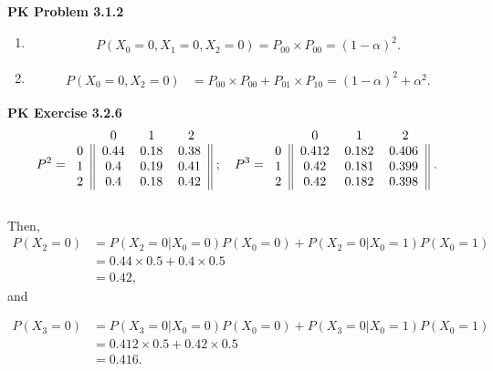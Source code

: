 \documentclass{article}
\begin{document}
\textbf{PK Problem 3.1.2}
\begin{enumerate}[label=(\alph*)]
    \item \begin{align}
        P(X_0=0, X_1=0, X_2=0) = P_{00}\times P_{00} = (1-\alpha)^2. \nonumber
    \end{align}

    \item \begin{align}
        P(X_0=0, X_2=0) & = P_{00}\times P_{00} + P_{01}\times P_{10} = (1-\alpha)^2 + \alpha^2. \nonumber
    \end{align}
\end{enumerate}
\bigbreak


\textbf{PK Exercise 3.2.6}
\begin{align}
    P^2 = 
    \begin{blockarray}{cccc}
        & 0 & 1 & 2  \\
        \begin{block}{c||ccc||}
          0 & 0.44 & 0.18 & 0.38  \\
          1 & 0.4 & 0.19 & 0.41  \\
          2 & 0.4 & 0.18 & 0.42  \\
        \end{block}
    \end{blockarray}~; \quad
    P^3 =
    \begin{blockarray}{cccc}
        & 0 & 1 & 2  \\
        \begin{block}{c||ccc||}
          0 & 0.412 & 0.182 & 0.406  \\
          1 & 0.42 & 0.181 & 0.399  \\
          2 & 0.42 & 0.182 & 0.398  \\
        \end{block}
    \end{blockarray}~. \nonumber
\end{align}

Then,
\begin{align}
    P(X_2=0) & = P(X_2=0|X_0=0)P(X_0=0) + P(X_2=0|X_0=1)P(X_0=1) \nonumber \\ 
    & = 0.44 \times 0.5 + 0.4 \times 0.5 \nonumber \\
    & = 0.42, \nonumber
\end{align} and

\begin{align}
    P(X_3=0) & = P(X_3=0|X_0=0)P(X_0=0) + P(X_3=0|X_0=1)P(X_0=1) \nonumber \\
    & = 0.412 \times 0.5 + 0.42 \times 0.5 \nonumber \\
    & = 0.416. \nonumber
\end{align}
\bigbreak
\end{document}
